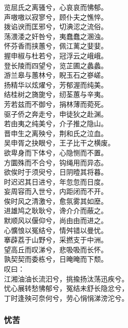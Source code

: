 \documentclass[]{article}
\begin{document}
览屈氏之离骚兮，心哀哀而怫郁。\\
声嗷嗷以寂寥兮，顾仆夫之憔悴。\\
拨谄谀而匡邪兮，切淟涊之流俗。\\
荡渨涹之奸咎兮，夷蠢蠢之溷浊。\\
怀芬香而挟蕙兮，佩江蓠之婓婓。\\
握申椒与杜若兮，冠浮云之峨峨。\\
登长陵而四望兮，览芷圃之蠡蠡。\\
游兰皋与蕙林兮，睨玉石之嵾嵯。\\
扬精华以炫燿兮，芳郁渥而纯美。\\
结桂树之旖旎兮，纫荃蕙与辛夷。\\
芳若兹而不御兮，捐林薄而菀死。\\
驱子侨之奔走兮，申徒狄之赴渊。\\
若由夷之纯美兮，介子推之隐山。\\
晋申生之离殃兮，荆和氏之泣血。\\
吴申胥之抉眼兮，王子比干之横废。\\
欲卑身而下体兮，心隐恻而不置。\\
方圜殊而不合兮，钩绳用而异态。\\
欲俟时于须臾兮，日阴曀其将暮。\\
时迟迟其日进兮，年忽忽而日度。\\
妄周容而入世兮，内距闭而不开。\\
俟时风之清激兮，愈氛雾其如塺。\\
进雄鸠之耿耿兮，谗介介而蔽之。\\
默顺风以偃仰兮，尚由由而进之。\\
心懭悢以冤结兮，情舛错以曼忧。\\
搴薜荔于山野兮，采撚支于中洲。\\
望高丘而叹涕兮，悲吸吸而长怀。\\
孰契契而委栋兮，日晻晻而下颓。\\
叹曰：\\
江湘油油长流汩兮，挑揄扬汰荡迅疾兮。\\
忧心展转愁怫郁兮，冤结未舒长隐忿兮，\\
丁时逢殃可奈何兮，劳心悁悁涕滂沱兮。

\hypertarget{header-n3107}{%
\subsubsection{忧苦}\label{header-n3107}}
\end{document}
